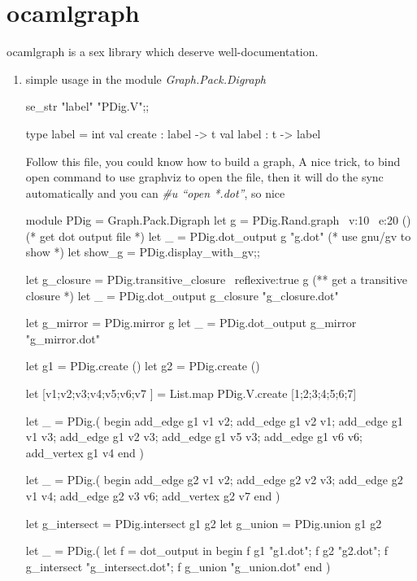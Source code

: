 \section{ocamlgraph}
\label{sec:ocamlgraph}

ocamlgraph is a sex library which deserve well-documentation.

\begin{enumerate}
\item simple usage in the module \textit{Graph.Pack.Digraph}

  \begin{ocamlcode}
  se_str "label" "PDig.V";;
\end{ocamlcode}

\begin{ocamlcode}
  type label = int
  val create : label -> t
  val label : t -> label    
\end{ocamlcode}

Follow this file, you could know how to build a graph,
A nice trick, to bind open command to use graphviz to open the 
file, then it will do the sync automatically 
and you can \textit{\#u ``open *.dot''}, so nice
\begin{ocamlcode}
module PDig = Graph.Pack.Digraph
let g = PDig.Rand.graph ~v:10 ~e:20 () 
(* get dot output file *)
let _ = PDig.dot_output g "g.dot" 
(* use gnu/gv to show *)
let show_g = PDig.display_with_gv;;

let g_closure = PDig.transitive_closure ~reflexive:true g 
(** get a transitive closure *)
let _ = PDig.dot_output g_closure "g_closure.dot"

let g_mirror = PDig.mirror g 
let _ = PDig.dot_output g_mirror "g_mirror.dot"

let g1 = PDig.create ()
let g2 = PDig.create ()


let [v1;v2;v3;v4;v5;v6;v7 ] = List.map PDig.V.create [1;2;3;4;5;6;7]

let _ = PDig.( begin
  add_edge g1 v1 v2;
  add_edge g1 v2 v1;
  add_edge g1 v1 v3;
  add_edge g1 v2 v3;
  add_edge g1 v5 v3;
  add_edge g1 v6 v6;
  add_vertex g1 v4
  end 
)

let _ = PDig.( begin
  add_edge g2 v1 v2;
  add_edge g2 v2 v3;
  add_edge g2 v1 v4;
  add_edge g2 v3 v6;
  add_vertex g2 v7
end
)

let g_intersect = PDig.intersect g1 g2 
let g_union = PDig.union g1 g2 

let _ = 
  PDig.(
    let f = dot_output in begin
    f g1 "g1.dot";
    f g2 "g2.dot";
    f g_intersect "g_intersect.dot"; 
    f g_union "g_union.dot"
    end 
  )
\end{ocamlcode}


\end{enumerate}
